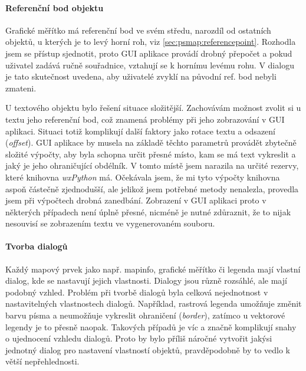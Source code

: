 \documentclass[a4paper,12pt,draft]{article}
\begin{document}
 \paragraph*{Referenční bod objektu}
 Grafické měřítko má referenční bod ve svém středu, narozdíl
 od ostatních objektů, u kterých je to levý horní roh, viz
 \ref{sec:psmap:referencepoint}. Rozhodla jsem se přístup sjednotit,
 proto GUI aplikace provádí drobný přepočet a pokud uživatel zadává
 ručně souřadnice, vztahují se k hornímu levému rohu. V dialogu je
 tato skutečnost uvedena, aby uživatelé zvyklí na původní ref. bod
 nebyli zmateni.

 U textového objektu bylo řešení situace složitější. Zachovávám
 možnost zvolit si u textu jeho referenční bod, což znamená problémy
 při jeho zobrazování v GUI aplikaci. Situaci totiž komplikují další
 faktory jako rotace textu a odsazení (\emph{offset}).
 GUI aplikace by musela na základě těchto parametrů provádět zbytečně
 složité výpočty, aby byla schopna určit přesné místo, kam se
 má text vykreslit a jaký je jeho ohraničující obdélník. V tomto
 místě jsem narazila na určité rezervy, které knihovna \emph{wxPython}
 má. Očekávala jsem, že mi tyto výpočty knihovna aspoň částečně
 zjednodušší, ale jelikož jsem potřebné metody nenalezla, provedla
 jsem při výpočtech drobná zanedbání. Zobrazení v GUI aplikaci proto
 v některých případech není úplně přesné, nicméně je nutné
 zdůraznit, že to nijak nesouvisí se zobrazením textu ve  vygenerovaném
 souboru.

 \paragraph*{Tvorba dialogů}
 Každý mapový prvek jako např. mapinfo, grafické měřítko či legenda
 mají vlastní dialog, kde se nastavují jejich vlastnosti. Dialogy jsou
 různě rozsáhlé, ale mají podobný vzhled. Problém při tvorbě
 dialogů byla celková nejednotnost v nastavitelných vlastnostech
 dialogů. Například, rastrová legenda umožňuje změnit barvu písma a
 neumožňuje vykreslit ohraničení (\emph{border}), zatímco u vektorové
 legendy je to přesně naopak. Takových případů je víc a značně
 komplikují snahy o ujednocení vzhledu dialogů. Proto by bylo příliš
 náročné vytvořit jakýsi jednotný dialog pro nastavení vlastností
 objektů, pravděpodobně by to vedlo k větší nepřehlednosti.
\end{document}
